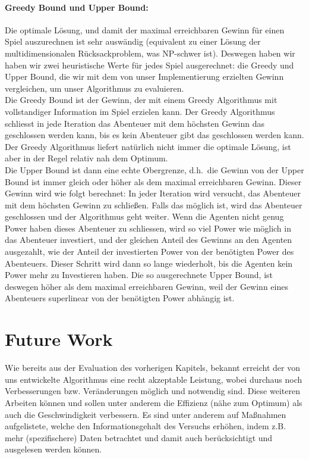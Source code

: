 \documentclass[fleqn,10pt]{SelfArx} %
\begin{document}
\paragraph{Greedy Bound und Upper Bound:}
Die optimale Lösung, und damit der maximal erreichbaren Gewinn für einen Spiel auszurechnen ist sehr auswändig (equivalent zu einer Lösung der multidimensionalen Rücksackproblem, was NP-schwer ist). Deswegen haben wir haben wir zwei heuristische Werte für jedes Spiel ausgerechnet: die Greedy und Upper Bound, die wir mit dem von unser Implementierung erzielten Gewinn vergleichen, um unser Algorithmus zu evaluieren. \\
Die Greedy Bound ist der Gewinn, der mit einem Greedy Algorithmus mit vollstandiger Information im Spiel erzielen kann. Der Greedy Algorithmus schliesst in jede Iteration das Abenteuer mit dem höchsten Gewinn das geschlossen werden kann, bis es kein Abenteuer gibt das geschlossen werden kann. Der Greedy Algorithmus liefert natürlich nicht immer die optimale Lösung, ist aber in der Regel relativ nah dem Optimum.\\
Die Upper Bound ist dann eine echte Obergrenze, d.h.\ die Gewinn von der Upper Bound ist immer gleich oder höher als dem maximal erreichbaren Gewinn. Dieser Gewinn wird wie folgt berechnet: In jeder Iteration wird versucht, das Abenteuer mit dem höchsten Gewinn zu schließen. Falls das möglich ist, wird das Abenteuer geschlossen und der Algorithmus geht weiter. Wenn die Agenten nicht genug Power haben dieses Abenteuer zu schliessen, wird so viel Power wie möglich in das Abenteuer investiert, und der gleichen Anteil des Gewinns an den Agenten ausgezahlt, wie der Anteil der investierten Power von der benötigten Power des Abenteuers. Dieser Schritt wird dann so lange wiederholt, bis die Agenten kein Power mehr zu Investieren haben. Die so ausgerechnete Upper Bound, ist deswegen höher als dem maximal erreichbaren Gewinn, weil der Gewinn eines Abenteuers superlinear von der benötigten Power abhängig ist.

\section{Future Work}
\label{sec:Future}

Wie bereits aus der Evaluation des vorherigen Kapitels, bekannt erreicht der von uns entwickelte Algorithmus eine recht akzeptable Leistung, wobei durchaus noch Verbesserungen bzw. Veränderungen möglich und notwendig sind. Diese weiteren Arbeiten können und sollen unter anderem die Effizienz (nähe zum Optimum) als auch die Geschwindigkeit verbessern. Es sind unter anderem auf Maßnahmen aufgelistete, welche den Informationsgehalt des Versuchs erhöhen, indem z.B. mehr (spezifischere) Daten betrachtet und damit auch berücksichtigt und ausgelesen werden können.
\end{document}
